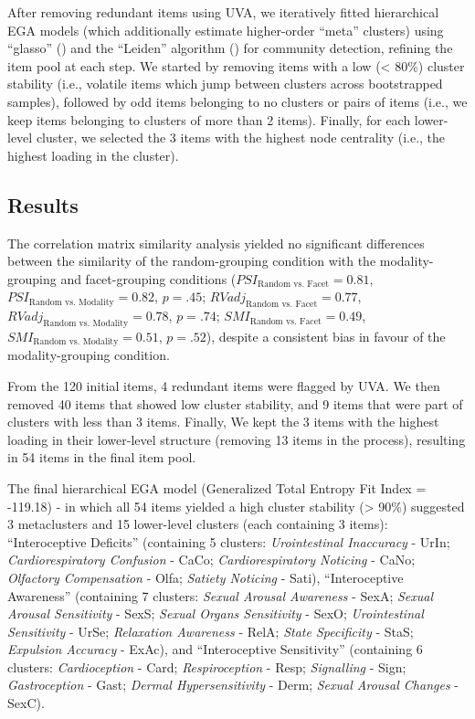 \documentclass[
  jou,
  floatsintext,
  longtable,
  nolmodern,
  notxfonts,
  notimes,
  colorlinks=true,linkcolor=blue,citecolor=blue,urlcolor=blue]{apa7}
\begin{document}
After removing redundant items using UVA, we iteratively fitted
hierarchical EGA models (which additionally estimate higher-order
``meta'' clusters) using ``glasso''
() and the
``Leiden'' algorithm () for community detection, refining the item pool at each step. We
started by removing items with a low (\textless{} 80\%) cluster
stability (i.e., volatile items which jump between clusters across
bootstrapped samples), followed by odd items belonging to no clusters or
pairs of items (i.e., we keep items belonging to clusters of more than 2
items). Finally, for each lower-level cluster, we selected the 3 items
with the highest node centrality (i.e., the highest loading in the
cluster).

\subsection{Results}\label{results}

The correlation matrix similarity analysis yielded no significant
differences between the similarity of the random-grouping condition with
the modality-grouping and facet-grouping conditions
(\(PSI_{\text{Random vs. Facet}} = 0.81\),
\(PSI_{\text{Random vs. Modality}} = 0.82\), \(p = .45\);
\(RVadj_{\text{Random vs. Facet}} = 0.77\),
\(RVadj_{\text{Random vs. Modality}} = 0.78\), \(p = .74\);
\(SMI_{\text{Random vs. Facet}} = 0.49\),
\(SMI_{\text{Random vs. Modality}} = 0.51\), \(p = .52\)), despite a
consistent bias in favour of the modality-grouping condition.

From the 120 initial items, 4 redundant items were flagged by UVA. We
then removed 40 items that showed low cluster stability, and 9 items
that were part of clusters with less than 3 items. Finally, We kept the
3 items with the highest loading in their lower-level structure
(removing 13 items in the process), resulting in 54 items in the final
item pool.

The final hierarchical EGA model (Generalized Total Entropy Fit Index =
-119.18) - in which all 54 items yielded a high cluster stability
(\textgreater{} 90\%) suggested 3 metaclusters and 15 lower-level
clusters (each containing 3 items): ``Interoceptive Deficits''
(containing 5 clusters: \emph{Urointestinal Inaccuracy} - UrIn;
\emph{Cardiorespiratory Confusion} - CaCo; \emph{Cardiorespiratory
Noticing} - CaNo; \emph{Olfactory Compensation} - Olfa; \emph{Satiety
Noticing} - Sati), ``Interoceptive Awareness'' (containing 7 clusters:
\emph{Sexual Arousal Awareness} - SexA; \emph{Sexual Arousal
Sensitivity} - SexS; \emph{Sexual Organs Sensitivity} - SexO;
\emph{Urointestinal Sensitivity} - UrSe; \emph{Relaxation Awareness} -
RelA; \emph{State Specificity} - StaS; \emph{Expulsion Accuracy} -
ExAc), and ``Interoceptive Sensitivity'' (containing 6 clusters:
\emph{Cardioception} - Card; \emph{Respiroception} - Resp;
\emph{Signalling} - Sign; \emph{Gastroception} - Gast; \emph{Dermal
Hypersensitivity} - Derm; \emph{Sexual Arousal Changes} - SexC).
\end{document}
